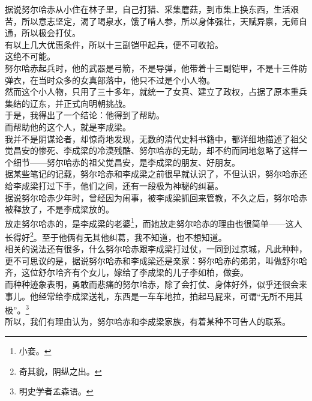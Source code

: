 \begin{multicols}{\theparacolNo}
据说努尔哈赤从小住在林子里，自己打猎、采集蘑菇，到市集上换东西，生活艰苦，所以意志坚定，渴了喝泉水，饿了啃人参，所以身体强壮，天赋异禀，无师自通，所以极会打仗。\\

有以上几大优惠条件，所以十三副铠甲起兵，便不可收拾。\\

这绝不可能。\\

努尔哈赤起兵时，他的武器是弓箭，不是导弹，他带着十三副铠甲，不是十三件防弹衣，在当时众多的女真部落中，他只不过是个小人物。\\

然而这个小人物，只用了三十多年，就统一了女真、建立了政权，占据了原本重兵集结的辽东，并正式向明朝挑战。\\

于是，我得出了一个结论：他得到了帮助。\\

而帮助他的这个人，就是李成梁。\\

我并不是阴谋论者，却惊奇地发现，无数的清代史料书籍中，都详细地描述了祖父觉昌安的惨死、李成梁的冷漠残酷、努尔哈赤的无助，却不约而同地忽略了这样一个细节——努尔哈赤的祖父觉昌安，是李成梁的朋友、好朋友。\\

据某些笔记的记载，努尔哈赤和李成梁之前很早就认识了，不但认识，努尔哈赤还给李成梁打过下手，他们之间，还有一段极为神秘的纠葛。\\

据说努尔哈赤少年时，曾经因为闹事，被李成梁抓回来管教，不久之后，努尔哈赤被释放了，不是李成梁放的。\\

放走努尔哈赤的，是李成梁的老婆\footnote{小妾。}，而她放走努尔哈赤的理由也很简单——这人长得好\footnote{奇其貌，阴纵之出。}。至于他俩有无其他纠葛，我不知道，也不想知道。\\

相关的说法还有很多，什么努尔哈赤跟李成梁打过仗，一同到过京城，凡此种种，更不可思议的是，据说努尔哈赤和李成梁还是亲家：努尔哈赤的弟弟，叫做舒尔哈齐，这位舒尔哈齐有个女儿，嫁给了李成梁的儿子李如柏，做妾。\\

而种种迹象表明，勇敢而悲痛的努尔哈赤，除了会打仗、身体好外，似乎还很会来事儿。他经常给李成梁送礼，东西是一车车地拉，拍起马屁来，可谓“无所不用其极”。\footnote{明史学者孟森语。}\\

所以，我们有理由认为，努尔哈赤和李成梁家族，有着某种不可告人的联系。\\


\end{multicols}

